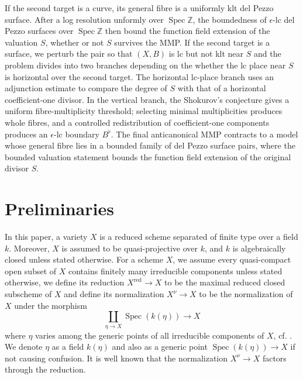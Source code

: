\documentclass[letterpaper,reqno,12pt]{amsart}
\DeclareMathOperator{\Spec}{Spec}
\numberwithin{equation}{section}
\theoremstyle{plain}
\begin{document}
If the second target is a curve, its general fibre is a uniformly klt del Pezzo surface. After a log resolution unformly over $\Spec\mathbb Z$, the boundedness of $\epsilon$-lc del Pezzo surfaces over $\Spec\mathbb Z$ then bound the function field extension of the valuation $S$, whether or not $S$ survives the MMP.  If the second target is a surface, we perturb the pair so that $(X,B)$ is lc but not klt near $S$ and the problem divides into two branches depending on the whether the lc place near $S$ is horizontal over the second target. The horizontal lc-place branch uses an adjunction estimate to compare the degree of $S$ with that of a horizontal coefficient-one divisor.  In the vertical branch, the Shokurov's conjecture gives a uniform fibre-multiplicity threshold; selecting minimal multiplicities produces whole fibres, and a controlled redistribution of coefficient-one components produces an $\epsilon$-lc boundary $B^\flat$.   The final anticanonical MMP contracts to a model whose general fibre lies in a bounded family of del Pezzo surface pairs, where the bounded valuation statement bounds the function field extension of the original divisor $S$.

\section{Preliminaries}
In this paper, a variety $X$ is a reduced scheme separated of finite type over a field $k$. Moreover, $X$ is assumed to be quasi-projective over $k$, and $k$ is algebraically closed unless stated otherwise. For a scheme $X$, we assume every quasi-compact open subset of $X$ contains finitely many irreducible components unless stated otherwise, we define its reduction $X^\text{red}\to X$ to be the maximal reduced closed subscheme of $X$ and define its normalization $X^\nu\to X$ to be the normalization of $X$ under the morphism \[\coprod\limits_{\eta\to X}\Spec (k(\eta))\to X\] where $\eta$ varies among the generic points of all irreducible components of $X$, cf. \cite[\href{https://stacks.math.columbia.edu/tag/035E}{Tag 035E}]{stacks-project}. We denote $\eta$ as a field $k(\eta)$ and also as a generic point $\Spec(k(\eta))\to X$ if not causing confusion. It is well known that the normalization $X^\nu\to X$ factors through the reduction.
\end{document}
